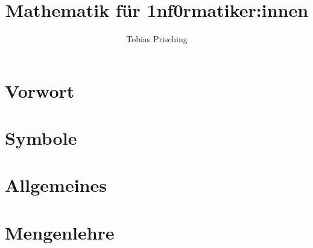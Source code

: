 \documentclass[a4paper,10pt,ngerman]{scrreprt}
\title{Mathematik für 1nf0rmatiker:innen}
\author{Tobias Prisching}
\date{ }
\theoremstyle{definition}
\begin{document}
	
	
	\maketitle
	
	\newpage

	\tableofcontents
	
	\clearpage
	\restoregeometry

	\newpage
	\chapter*{Vorwort}\label{Vorwort}
	
	
	\newpage
	\chapter*{Symbole}\label{Symbole}
	
	
	
	\newpage
	\chapter{Allgemeines}\label{kapitel:Allgemeines}	
		
	
	\newpage
	\chapter{Mengenlehre}\label{kapitel:Mengenlehre}	
	
	
\end{document}
